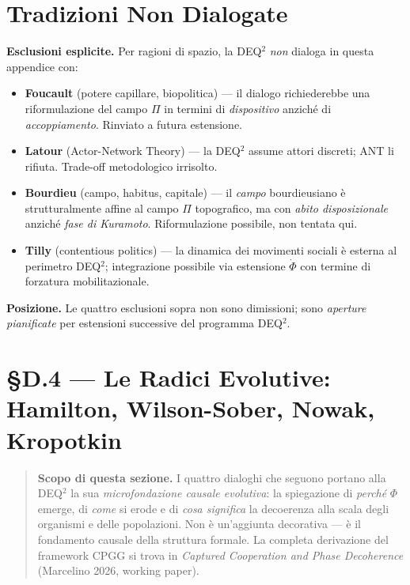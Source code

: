 \section{Tradizioni Non Dialogate}\label{tradizioni-non-dialogate}

\Conj{} \textbf{Esclusioni esplicite.} Per ragioni di spazio, la DEQ$^2$
\emph{non} dialoga in questa appendice con:

\begin{itemize}
\tightlist
\item
  \textbf{Foucault} (potere capillare, biopolitica) --- il dialogo
  richiederebbe una riformulazione del campo \(\Pi\) in termini di
  \emph{dispositivo} anziché di \emph{accoppiamento}. Rinviato a futura
  estensione.
\item
  \textbf{Latour} (Actor-Network Theory) --- la DEQ$^2$ assume attori
  discreti; ANT li rifiuta. Trade-off metodologico irrisolto.
\item
  \textbf{Bourdieu} (campo, habitus, capitale) --- il \emph{campo}
  bourdieusiano è strutturalmente affine al campo \(\Pi\) topografico,
  ma con \emph{abito disposizionale} anziché \emph{fase di Kuramoto}.
  Riformulazione possibile, non tentata qui.
\item
  \textbf{Tilly} (contentious politics) --- la dinamica dei movimenti
  sociali è esterna al perimetro DEQ$^2$; integrazione possibile via
  estensione \(\dot\Phi\) con termine di forzatura mobilitazionale.
\end{itemize}

\Proved{} \textbf{Posizione.} Le quattro esclusioni sopra non sono
dimissioni; sono \emph{aperture pianificate} per estensioni successive
del programma DEQ$^2$.



\section{§D.4 — Le Radici Evolutive: Hamilton, Wilson-Sober, Nowak,
Kropotkin}\label{d4-radici-evolutive}

\begin{quote}
\textbf{Scopo di questa sezione.} I quattro dialoghi che seguono
portano alla DEQ$^2$ la sua \emph{microfondazione causale evolutiva}: la
spiegazione di \emph{perché} $\Phi$ emerge, di \emph{come} si erode e di
\emph{cosa significa} la decoerenza alla scala degli organismi e delle
popolazioni. Non è un'aggiunta decorativa --- è il fondamento causale
della struttura formale. La completa derivazione del framework CPGG si
trova in \emph{Captured Cooperation and Phase Decoherence} (Marcelino
2026, working paper).
\end{quote}

